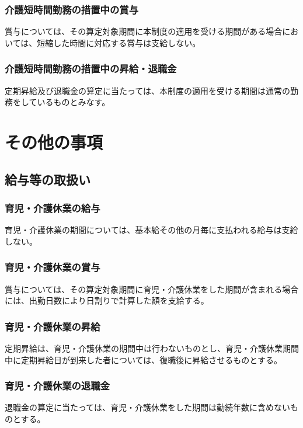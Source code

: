 \documentclass{jsarticle}
\begin{document}
\subsubsection{介護短時間勤務の措置中の賞与}
\label{育介_項_介護短時間勤務の措置中の賞与}
賞与については、その算定対象期間に本制度の適用を受ける期間がある場合においては、短縮した時間に対応する賞与は支給しない。

\subsubsection{介護短時間勤務の措置中の昇給・退職金}
\label{育介_項_介護短時間勤務の措置中の昇給・退職金}
定期昇給及び退職金の算定に当たっては、本制度の適用を受ける期間は通常の勤務をしているものとみなす。

\section{その他の事項}

\subsection{給与等の取扱い}
\label{育介_条_給与等の取扱い}

\subsubsection{育児・介護休業の給与}
\label{育介_項_育児・介護休業の給与}
育児・介護休業の期間については、基本給その他の月毎に支払われる給与は支給しない。

\subsubsection{育児・介護休業の賞与}
\label{育介_項_育児・介護休業の賞与}
賞与については、その算定対象期間に育児・介護休業をした期間が含まれる場合には、出勤日数により日割りで計算した額を支給する。

\subsubsection{育児・介護休業の昇給}
\label{育介_項_育児・介護休業の昇給}
定期昇給は、育児・介護休業の期間中は行わないものとし、育児・介護休業期間中に定期昇給日が到来した者については、復職後に昇給させるものとする。

\subsubsection{育児・介護休業の退職金}
\label{育介_項_育児・介護休業の退職金}
退職金の算定に当たっては、育児・介護休業をした期間は勤続年数に含めないものとする。
\end{document}
